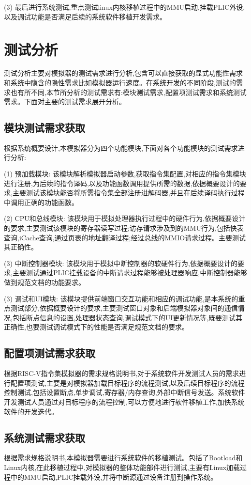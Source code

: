(3) 最后进行系统测试,重点测试linux内核移植过程中的MMU启动,挂载PLIC外设,以及调试功能是否满足后续的系统软件移植开发需求。


\section{测试分析}
测试分析主要对模拟器的测试需求进行分析,包含可以直接获取的显式功能性需求和系统中隐含的隐性需求比如模拟器运行速度。在系统开发的不同阶段,测试的需求也有所不同,本节所分析的测试需求有:模块测试需求,配置项测试需求和系统测试需求。下面对主要的测试需求展开分析。

\subsection{模块测试需求获取}
根据系统概要设计,本模拟器分为四个功能模块,下面对各个功能模块的测试需求进行分析:


(1) 预加载模块: 该模块解析模拟器启动参数,获取指令集配置,对相应的指令集模块进行注册,为后续的指令译码,以及功能函数调用提供所需的数据,依据概要设计的要求,主要测试该模块能否将所需指令集全部注册进解码器,并且在后续译码执行过程中调用正确的功能函数。


(2) CPU和总线模块: 该模块用于模拟处理器执行过程中的硬件行为,依据概要设计的要求,主要测试该模块的寄存器读写过程;访存请求涉及到的MMU行为,包括快表查询,iCache查询,通过页表的地址翻译过程;经过总线的MMIO请求过程。主要测试其正确性。


(3) 中断控制器模块: 该模块用于模拟中断控制器的软硬件行为,依据概要设计的要求,主要测试通过PLIC挂载设备的中断请求过程能够被处理器响应,中断控制器能够做到规范文档的功能要求。

(3) 调试和UI模块: 该模块提供前端窗口交互功能和相应的调试功能,是本系统的重点测试部分,依据概要设计的要求,主要测试窗口对象和后端模拟器对象间的通信情况,包括断点信息的设置,处理器状态查询,调试模式下的UI更新情况等,既要测试其正确性,也要测试调试模式下的性能是否满足规范文档的要求。


\subsection{配置项测试需求获取}
根据RISC-V指令集模拟器的需求规格说明书,对于系统软件开发测试人员的需求进行配置项测试,主要是对模拟器加载目标程序的流程测试,以及后续目标程序的流程控制测试,包括设置断点,单步调试,寄存器/内存查询,外部中断信号发送。系统软件开发测试人员通过对目标程序的流程控制,可以方便地进行软件移植工作,加快系统软件的开发迭代。

\subsection{系统测试需求获取}
根据需求规格说明书,本模拟器需要进行系统软件的移植测试。包括了Bootload和Linux内核,在此移植过程中,对模拟器的整体功能部件进行测试,主要有Linux加载过程中的MMU启动,PLIC挂载外设,并将中断源通过设备注册到操作系统。

